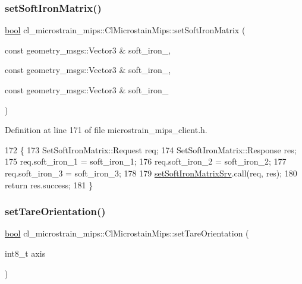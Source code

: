 \subsubsection{\texorpdfstring{set\+Soft\+Iron\+Matrix()}{setSoftIronMatrix()}}
{\footnotesize\ttfamily \hyperlink{classbool}{bool} cl\+\_\+microstrain\+\_\+mips\+::\+Cl\+Microstain\+Mips\+::set\+Soft\+Iron\+Matrix (\begin{DoxyParamCaption}\item[{const geometry\+\_\+msgs\+::\+Vector3 \&}]{soft\+\_\+iron\+\_,  }\item[{const geometry\+\_\+msgs\+::\+Vector3 \&}]{soft\+\_\+iron\+\_,  }\item[{const geometry\+\_\+msgs\+::\+Vector3 \&}]{soft\+\_\+iron\+\_ }\end{DoxyParamCaption})\hspace{0.3cm}{\ttfamily [inline]}}



Definition at line 171 of file microstrain\+\_\+mips\+\_\+client.\+h.


\begin{DoxyCode}
172     \{
173         SetSoftIronMatrix::Request req;
174         SetSoftIronMatrix::Response res;
175         req.soft\_iron\_1 = soft\_iron\_1;
176         req.soft\_iron\_2 = soft\_iron\_2;
177         req.soft\_iron\_3 = soft\_iron\_3;
178 
179         \hyperlink{classcl__microstrain__mips_1_1ClMicrostainMips_a2e46116a0dbc6acdf6384467d0c3a50d}{setSoftIronMatrixSrv}.call(req, res);
180         \textcolor{keywordflow}{return} res.success;
181     \}
\end{DoxyCode}
\mbox{\label{classcl__microstrain__mips_1_1ClMicrostainMips_a84173859b79a7bad8861b7ea14f15c6a}} 
\subsubsection{\texorpdfstring{set\+Tare\+Orientation()}{setTareOrientation()}}
{\footnotesize\ttfamily \hyperlink{classbool}{bool} cl\+\_\+microstrain\+\_\+mips\+::\+Cl\+Microstain\+Mips\+::set\+Tare\+Orientation (\begin{DoxyParamCaption}\item[{int8\+\_\+t}]{axis }\end{DoxyParamCaption})\hspace{0.3cm}{\ttfamily [inline]}}



